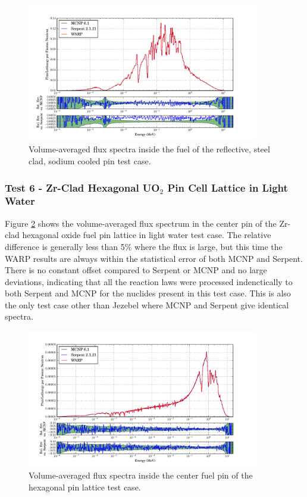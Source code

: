 \documentclass[preprint,12pt]{elsarticle}
\begin{document}
\begin{figure}[h!]
\centering
\includegraphics[width=0.9\textwidth,trim= 1cm 0cm 1cm 0cm]{graphics/sodiumpin_spec.pdf}
\caption{Volume-averaged flux spectra inside the fuel of the reflective, steel clad, sodium cooled pin test case. \label{sodiumpin_spec} }
\end{figure}


\newpage
\subsubsection{Test 6 - Zr-Clad Hexagonal UO$_2$ Pin Cell Lattice in Light Water}

Figure \ref{assembly-lw_spec} shows the volume-averaged flux spectrum in the center pin of the Zr-clad hexagonal oxide fuel pin lattice in light water test case. The relative difference is generally less than 5\% where the flux is large, but this time the WARP results are always within the statistical error of both MCNP and Serpent.  There is no constant offset compared to Serpent or MCNP and no large deviations, indicating that all the reaction laws were processed indenctically to both Serpent and MCNP for the nuclides present in this test case.  This is also the only test case other than Jezebel where MCNP and Serpent give identical spectra.

\begin{figure}[h!]
\centering
\includegraphics[width=0.9\textwidth,trim= 1cm 0cm 1cm 0cm]{graphics/assembly-lw_spec.pdf}
\caption{Volume-averaged flux spectra inside the center fuel pin of the hexagonal pin lattice test case. \label{assembly-lw_spec} }
\end{figure}
\end{document}
